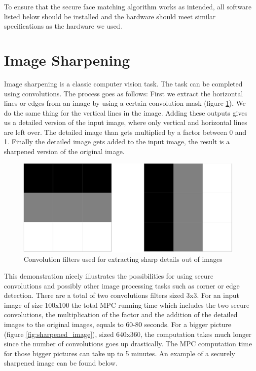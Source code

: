 To ensure that the secure face matching algorithm works as intended, all software listed below should be installed and the hardware should meet similar specifications as the hardware we used.

\section{Image Sharpening}
Image sharpening is a classic computer vision task. The task can be completed using convolutions. The process goes as follows: First we extract the horizontal lines or edges from an image by using a certain convolution mask (figure \ref{fig:sharp_mask}). We do the same thing for the vertical lines in the image. Adding these outputs gives us a detailed version of the input image, where only vertical and horizontal lines are left over. The detailed image than gets multiplied by a factor between 0 and 1. Finally the detailed image gets added to the input image, the result is a sharpened version of the original image.

\begin{figure}[H]
  \includegraphics[scale=0.2]{fig/sharp_mask.png}
  \centering
  \caption{Convolution filters used for extracting sharp details out of images}
  \label{fig:sharp_mask}
\end{figure}

This demonstration nicely illustrates the possibilities for using secure convolutions and possibly other image processing tasks such as corner or edge detection. There are a total of two convolutions filters sized $3$x$3$. For an input image of size $100$x$100$ the total MPC running time which includes the two secure convolutions, the multiplication of the factor and the addition of the detailed images to the original images, equals to 60-80 seconds. For a bigger picture (figure \ref{fig:sharpened_image}), sized $640$x$360$, the computation takes much longer since the number of convolutions goes up drastically. The MPC computation time for those bigger pictures can take up to 5 minutes. An example of a securely sharpened image can be found below.

